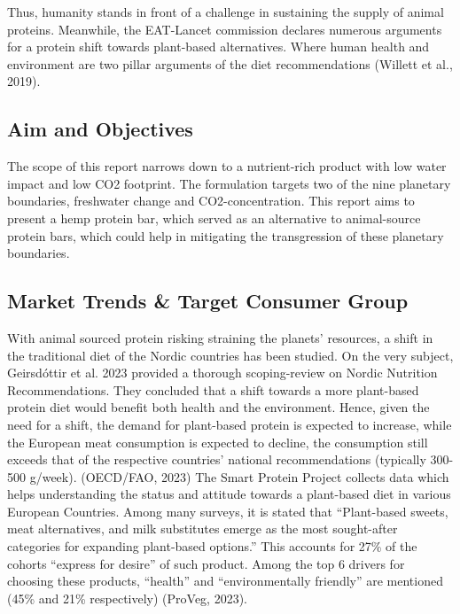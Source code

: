 Thus, humanity stands in front of a challenge in sustaining the supply of animal proteins. Meanwhile, the EAT-Lancet commission declares numerous arguments for a protein shift towards plant-based alternatives. Where human health and environment are two pillar arguments of the diet recommendations (Willett et al., 2019).

\subsection{Aim and Objectives}
The scope of this report narrows down to a nutrient-rich product with low water impact and low CO2  footprint. The formulation targets two of the nine planetary boundaries, freshwater change and CO2-concentration. This report aims to present a hemp protein bar, which served as an alternative to animal-source protein bars, which could help in mitigating the transgression of these planetary boundaries. 

\subsection{Market Trends \& Target Consumer Group}
With animal sourced protein risking straining the planets' resources, a shift in the traditional diet of the Nordic countries has been studied. On the very subject, Geirsdóttir et al. 2023 provided a thorough scoping-review on Nordic Nutrition Recommendations. They concluded that a shift towards a more plant-based protein diet would benefit both health and the environment. Hence, given the need for a shift, the demand for plant-based protein is expected to increase, while the European meat consumption is expected to decline, the consumption still exceeds that of the respective countries' national recommendations (typically 300-500 g/week). (OECD/FAO, 2023) The Smart Protein Project collects data which helps understanding the status and attitude towards a plant-based diet in various European Countries. Among many surveys, it is stated that “Plant-based sweets, meat alternatives, and milk substitutes emerge as the most sought-after categories for expanding plant-based options.” This accounts for 27\% of the cohorts “express for desire” of such product. Among the top 6 drivers for choosing these products, “health” and “environmentally friendly” are mentioned (45\% and 21\% respectively) (ProVeg, 2023). 

